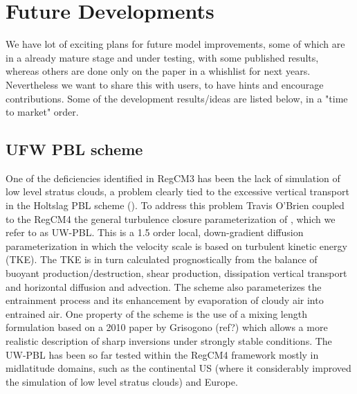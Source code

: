 
\chapter{Future Developments}

We have lot of exciting plans for future model improvements, some of which
are in a already mature stage and under testing, with some published results,
whereas others are done only on the paper in a whishlist for next years.
Nevertheless we want to share this with users, to have hints and encourage
contributions.
Some of the development results/ideas are listed below, in a "time to market"
order.

\section{UFW PBL scheme}

One of the deficiencies identified in \ac{RegCM3} has been the lack of
simulation of low level stratus clouds, a problem clearly tied to the excessive
vertical transport in the Holtslag PBL scheme (\cite{OBrien_11}).
To address this problem Travis O’Brien coupled to the \ac{RegCM4} the general
turbulence closure parameterization of \citep{Grenier_01,Bretherton_04},
which we refer to as UW-PBL. This is a 1.5 order local, down-gradient diffusion
parameterization in which the velocity scale is based on turbulent kinetic
energy (TKE). The TKE is in turn calculated prognostically from the balance of
buoyant production/destruction, shear production, dissipation vertical transport
and horizontal diffusion and advection. The scheme also parameterizes the
entrainment process  and its enhancement by evaporation of cloudy air into
entrained air. One property of the scheme is the use of a mixing length
formulation based on a 2010 paper by Grisogono (ref?) which allows a more
realistic description of sharp inversions under strongly stable conditions.
The UW-PBL has been so far tested within the \ac{RegCM4} framework mostly in
midlatitude domains, such as the continental US (where it considerably improved
the simulation of low level stratus clouds) and Europe.

